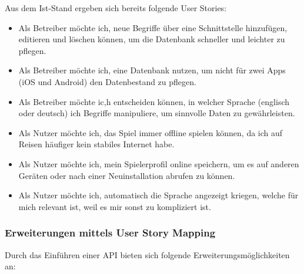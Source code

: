 {Aus dem Ist-Stand ergeben sich bereits folgende User Stories: 

\begin{itemize}
	\item Als Betreiber möchte ich, neue Begriffe über eine Schnittstelle hinzufügen, editieren und löschen können, um die Datenbank schneller und leichter zu pflegen.
	\item Als Betreiber möchte ich, eine Datenbank nutzen, um nicht für zwei Apps (iOS und Android) den Datenbestand zu pflegen.
	\item Als Betreiber möchte ic,h entscheiden können, in welcher Sprache (englisch oder deutsch) ich Begriffe manipuliere, um sinnvolle Daten zu gewährleisten.
	\item Als Nutzer möchte ich, das Spiel immer offline spielen können, da ich auf Reisen häufiger kein stabiles Internet habe.
	\item Als Nutzer möchte ich, mein Spielerprofil online speichern, um es auf anderen Geräten oder nach einer Neuinstallation abrufen zu können.
	\item Als Nutzer möchte ich, automatisch die Sprache angezeigt kriegen, welche für mich relevant ist, weil es mir sonst zu kompliziert ist.
\end{itemize}

\subsubsection{Erweiterungen mittels User Story Mapping}

Durch das Einführen einer API bieten sich folgende Erweiterungsmöglichkeiten an:

}
